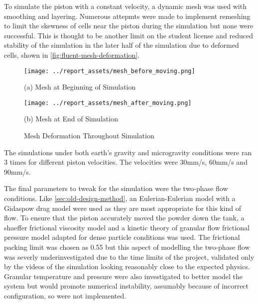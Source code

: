 To simulate the piston with a constant velocity, a dynamic mesh was used with smoothing and layering. Numerous attepmts were made to implement remeshing to limit the skewness of cells near the piston during the simulation but none were successful. This is thought to be another limit on the student license and reduced stability of the simulation in the later half of the simulation due to deformed cells, shown in \autoref{fig:fluent-mesh-deformation}.
\begin{figure}[htbp]
    \centering

    \begin{minipage}{0.45\textwidth}
        \centering
        \texttt{[image: ../report\_assets/mesh\_before\_moving.png]}
        \caption*{(a) Mesh at Beginning of Simulation}\label{fig:beginning-mesh}
    \end{minipage}
    \hfill
    \begin{minipage}{0.45\textwidth}
        \centering
        \texttt{[image: ../report\_assets/mesh\_after\_moving.png]}
        \caption*{(b) Mesh at End of Simulation}
    \end{minipage}
    \caption{Mesh Deformation Throughout Simulation}\label{fig:fluent-mesh-deformation}
\end{figure}
The simulations under both earth's gravity and microgravity conditions were ran 3 times for different piston velocities. The velocities were 30mm/s, 60mm/s and 90mm/s.

The final parameters to tweak for the simulation were the two-phase flow conditions. Like \autoref{sec:old-design-method}, an Eulerian-Eulerian model with a Gidaspow drag model were used as they are most appropriate for this kind of flow. To ensure that the piston accurately moved the powder down the tank, a shaeffer frictional viscosity model and a kinetic theory of granular flow frictional pressure model adapted for dense particle conditions was used. The frictional packing limit was chosen as 0.55 but this aspect of modelling the two-phase flow was severly underinvestigated due to the time limits of the project, validated only by the videos of the simulation looking reasonably close to the expected physics. Granular temperature and pressure were also investigated to better model the system but would promote numerical instability, assumably because of incorrect configuration, so were not implemented.



















